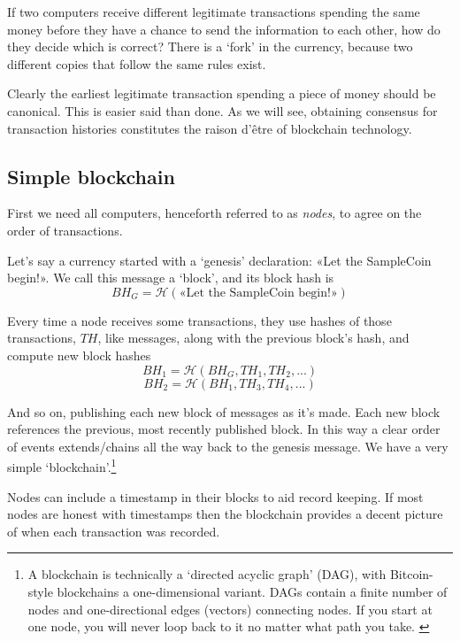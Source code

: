 If two computers receive different legitimate transactions spending the same money before they have a chance to send the information to each other, how do they decide which is correct? There is a `fork' in the currency, because two different copies that follow the same rules exist.

Clearly the earliest legitimate transaction spending a piece of money should be canonical. This is easier said than done. As we will see, obtaining consensus for transaction histories constitutes the raison d'\^{e}tre of blockchain technology.


\subsection{Simple blockchain}
\label{subsec:simple-blockchain}

First we need all computers, henceforth referred to as {\em nodes}, to agree on the order of transactions.

Let's say a currency started with a `genesis' declaration: «Let the SampleCoin begin!». We call this message a `block', and its block hash is \vspace{.175cm}
\[\mathit{BH}_G = \mathcal{H}(\textrm{«Let the SampleCoin begin!»})\]

Every time a node receives some transactions, they use hashes of those transactions, $\mathit{TH}$, like messages, along with the previous block's hash, and compute new block hashes\vspace{.175cm}
\[\mathit{BH}_1 = \mathcal{H}(\mathit{BH}_G, \mathit{TH}_1, \mathit{TH}_2,...)\]
\[\mathit{BH}_2 = \mathcal{H}(\mathit{BH}_1, \mathit{TH}_3, \mathit{TH}_4,...)\]

And so on, publishing each new block of messages as it's made. Each new block references the previous, most recently published block. In this way a clear order of events extends/chains all the way back to the genesis message. We have a very simple `blockchain'.\footnote{A blockchain is technically a `directed acyclic graph' (DAG), with Bitcoin-style blockchains a one-dimensional variant. DAGs contain a finite number of nodes and one-directional edges (vectors) connecting nodes. If you start at one node, you will never loop back to it no matter what path you take. \cite{DAG-wikipedia}}

Nodes can include a timestamp in their blocks to aid record keeping. If most nodes are honest with timestamps then the blockchain provides a decent picture of when each transaction was recorded.

